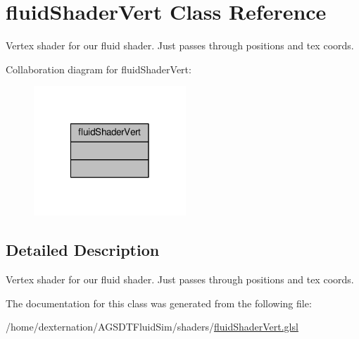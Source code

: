 \hypertarget{classfluid_shader_vert}{\section{fluid\-Shader\-Vert Class Reference}
\label{classfluid_shader_vert}
}


Vertex shader for our fluid shader. Just passes through positions and tex coords.  




Collaboration diagram for fluid\-Shader\-Vert\-:\nopagebreak
\begin{figure}[H]
\begin{center}
\leavevmode
\includegraphics[width=162pt]{classfluid_shader_vert__coll__graph}
\end{center}
\end{figure}


\subsection{Detailed Description}
Vertex shader for our fluid shader. Just passes through positions and tex coords. 

The documentation for this class was generated from the following file\-:\begin{DoxyCompactItemize}
\item 
/home/dexternation/\-A\-G\-S\-D\-T\-Fluid\-Sim/shaders/\hyperlink{fluid_shader_vert_8glsl}{fluid\-Shader\-Vert.\-glsl}\end{DoxyCompactItemize}
